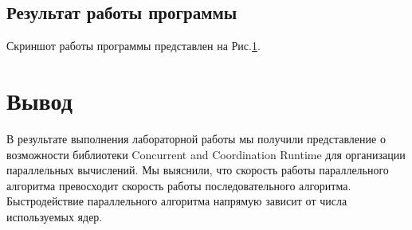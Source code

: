 \documentclass[russian,utf8,pointsection]{eskdtext}
\begin{document}
       	\subsection{Результат работы программы}
       	Скриншот работы программы представлен на Рис.\ref{ris:1_1}.
       	\begin{figure}[!h]
       		\caption{}
       		\label{ris:1_1}
       	\end{figure}
       	
	\section{Вывод}
	В результате выполнения лабораторной работы мы получили представление о возможности библиотеки Concurrent and Coordination Runtime для организации параллельных вычислений.
	Мы выяснили, что скорость работы параллельного алгоритма превосходит скорость работы последовательного алгоритма. Быстродействие параллельного алгоритма напрямую зависит от числа используемых ядер.
		
\end{document}
